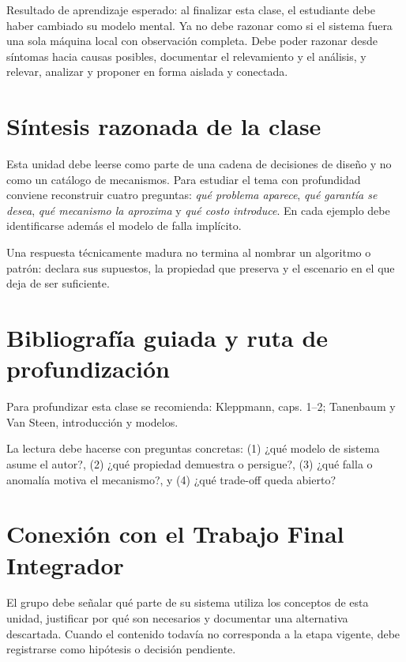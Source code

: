 \documentclass[variant=apuntes,cover=institutional,mode=screen]{ua-engineering-v6-article}
\begin{document}
\begin{uakeybox}
Resultado de aprendizaje esperado: al finalizar esta clase, el estudiante debe haber cambiado su modelo mental.
Ya no debe razonar como si el sistema fuera una sola máquina local con observación completa.
Debe poder razonar desde síntomas hacia causas posibles, documentar el relevamiento y el análisis, y relevar, analizar y proponer en forma aislada y conectada.
\end{uakeybox}


\section{Síntesis razonada de la clase}
Esta unidad debe leerse como parte de una cadena de decisiones de diseño y no como un catálogo de mecanismos. Para estudiar el tema con profundidad conviene reconstruir cuatro preguntas: \emph{qué problema aparece}, \emph{qué garantía se desea}, \emph{qué mecanismo la aproxima} y \emph{qué costo introduce}. En cada ejemplo debe identificarse además el modelo de falla implícito.

\begin{uakeybox}
Una respuesta técnicamente madura no termina al nombrar un algoritmo o patrón: declara sus supuestos, la propiedad que preserva y el escenario en el que deja de ser suficiente.
\end{uakeybox}

\section{Bibliografía guiada y ruta de profundización}
Para profundizar esta clase se recomienda: Kleppmann, caps. 1--2; Tanenbaum y Van Steen, introducción y modelos.

La lectura debe hacerse con preguntas concretas: (1) ¿qué modelo de sistema asume el autor?, (2) ¿qué propiedad demuestra o persigue?, (3) ¿qué falla o anomalía motiva el mecanismo?, y (4) ¿qué trade-off queda abierto?

\section{Conexión con el Trabajo Final Integrador}
El grupo debe señalar qué parte de su sistema utiliza los conceptos de esta unidad, justificar por qué son necesarios y documentar una alternativa descartada. Cuando el contenido todavía no corresponda a la etapa vigente, debe registrarse como hipótesis o decisión pendiente.
\end{document}

